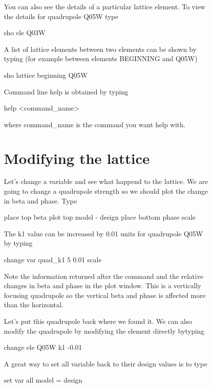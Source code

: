 \documentclass{report}
\begin{document}
\begin{figure}
You can also see the details of a particular lattice element. To view the details
for quadrupole Q05W type
\begin{example}
  sho ele Q03W
\end{example}

A list of lattice elements between two elements can be shown by typing (for
example between elements BEGINNING and Q05W)
\begin{example}
  sho lattice beginning Q05W
\end{example}

Command line help is obtained by typing
\begin{example}
  help <command\_name>
\end{example}
where \<command\_name\> is the command you want help with.

\chapter{Modifying the lattice}
\label{c:modify_lattice}

Let's change a variable and see what happend to the lattice. We are going to
change a quadrupole strength so we should plot the change in beta and phase.
Type
\begin{example}
  place top beta
  plot top model - design
  place bottom phase
  scale
\end{example}

The k1 value can be increased by 0.01 units for quadrupole Q05W by typing
\begin{example}
  change var quad\_k1 5 0.01
  scale
\end{example}
Note the information returned after the command and the relative changes in
beta and phase in the plot window. This is a vertically focusing quadrupole so
the vertical beta and phase is affected more than the horizontal.

Let's put this quadrupole back where we found it. We can also modify the quadrupole
by modifying the element directly bytyping
\begin{example}
  change ele Q05W k1 -0.01
\end{example}

A great way to set all variable back to their design values is to type
\begin{example}
  set var all model = design
\end{example}


\end{figure}
\end{document}
